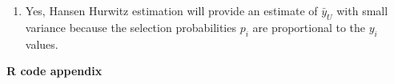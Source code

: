 \documentclass[12pt]{article}\usepackage[]{graphicx}\usepackage[]{color}
\begin{document}
\begin{doublespacing}
\begin{enumerate}
\begin{enumerate}
\begin{singlespace}
\end{singlespace}

\item Yes, Hansen Hurwitz estimation will provide an estimate of $\bar{y}_U$ with small variance because the selection probabilities $p_i$ are proportional to the $y_i$ values.

\end{enumerate}

\end{enumerate}

\end{doublespacing}

{\bf \large R code appendix}
\end{document}
